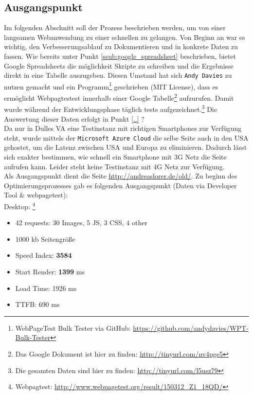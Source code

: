 	\subsection{Ausgangspunkt}
	\label{sub:ausgangspunkt}
		Im folgenden Abschnitt soll der Prozess beschrieben werden, um von einer langsamen Webanwendung zu einer schnellen zu gelangen. Von Beginn an war es wichtig, den Verbesserungsablauf zu Dokumentieren und in konkrete Daten zu fassen. Wie bereits unter Punkt \ref{ssub:google_spreadsheet} beschrieben, bietet Google Spreadsheets die möglichkeit Skripte zu schreiben und die Ergebnisse direkt in eine Tabelle auszugeben. Diesen Umstand hat sich \texttt{Andy Davies} zu nutzen gemacht und ein Programm\footnote{WebPageTest Bulk Tester via GitHub: \url{https://github.com/andydavies/WPT-Bulk-Tester}} geschrieben (MIT License), dass es ermöglicht Webpagtestest innerhalb einer Google Tabelle\footnote{Das Google Dokument ist hier zu finden: \url{http://tinyurl.com/nv4pge5}} aufzurufen. Damit wurde während der Entwicklungsphase täglich tests aufgezeichnet.\footnote{Die gesamten Daten sind hier zu finden: \url{http://tinyurl.com/l5usz79}} Die Auswertung dieser Daten erfolgt in Punkt \ref{..} ?\\

		Da nur in Dulles VA eine Testinstanz mit richtigen Smartphones zur Verfügung steht, wurde mittels der \texttt{Microsoft Azure Cloud} die selbe Seite auch in den USA gehostet, um die Latenz zwischen USA und Europa zu eliminieren. Dadurch lässt sich exakter bestimmen, wie schnell ein Smartphone mit 3G Netz die Seite aufrufen kann. Leider steht keine Testinstanz mit 4G Netz zur Verfügung.\\

		Als Ausgangspunkt dient die Seite \url{http://andreaslorer.de/old/}. Zu beginn des Optimierungsprozesses gab es folgenden Ausgangspunkt (Daten via Developer Tool \& webpagetest):\\

		Desktop: \footnote{Webpagtest: \url{http://www.webpagetest.org/result/150312_Z1_18QD/}}
		\begin{itemize}
			\item 42 requests: 30 Images, 5 JS, 3 CSS, 4 other
			\item 1000 kb Seitengröße
			\item Speed Index: \textbf{3584}
			\item Start Render: \textbf{1399}  ms
			\item Load Time: 1926 ms
			\item TTFB: 690 ms
		\end{itemize}

